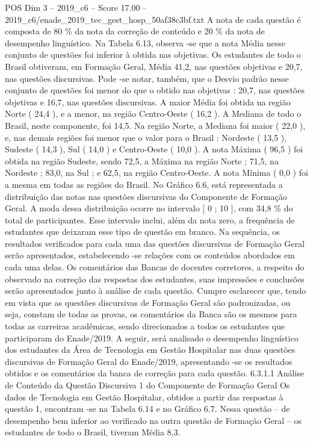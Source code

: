 \begin{textsample}{POS Dim 3 – 2019\_c6 – Score 17.00 – 2019\_c6/enade\_2019\_tec\_gest\_hosp\_50af38c3bf.txt}
A nota de cada questão é composta de 80 \% da nota da correção de conteúdo e 20 \% da nota de desempenho linguístico.
Na Tabela 6.13, observa -se que a nota Média nesse conjunto de questões foi inferior à obtida nas objetivas.
Os estudantes de todo o Brasil obtiveram, em Formação Geral, Média 41,2, nas questões objetivas e 20,7, nas questões discursivas.
Pode -se notar, também, que o Desvio padrão nesse conjunto de questões foi menor do que o obtido nas objetivas : 20,7, nas questões objetivas e 16,7, nas questões discursivas.
A maior Média foi obtida na região Norte ( 24,4 ), e a menor, na região Centro-Oeste ( 16,2 ).
A Mediana de todo o Brasil, neste componente, foi 14,5.
Na região Norte, a Mediana foi maior ( 22,0 ), e, nas demais regiões foi menor que o valor para o Brasil : Nordeste ( 13,5 ), Sudeste ( 14,3 ), Sul ( 14,0 ) e Centro-Oeste ( 10,0 ).
A nota Máxima ( 96,5 ) foi obtida na região Sudeste, sendo 72,5, a Máxima na região Norte ; 71,5, na Nordeste ; 83,0, na Sul ; e 62,5, na região Centro-Oeste.
A nota Mínima ( 0,0 ) foi a mesma em todas as regiões do Brasil.
No Gráfico 6.6, está representada a distribuição das notas nas questões discursivas do Componente de Formação Geral.
A moda dessa distribuição ocorre no intervalo [ 0 ; 10 ], com 34,8 \% do total de participantes.
Esse intervalo inclui, além da nota zero, a frequência de estudantes que deixaram esse tipo de questão em branco.
Na sequência, os resultados verificados para cada uma das questões discursivas de Formação Geral serão apresentados, estabelecendo -se relações com os conteúdos abordados em cada uma delas.
Os comentários das Bancas de docentes corretores, a respeito do observado na correção das respostas dos estudantes, suas impressões e conclusões serão apresentados junto à análise de cada questão.
Cumpre esclarecer que, tendo em vista que as questões discursivas de Formação Geral são padronizadas, ou seja, constam de todas as provas, os comentários da Banca são os mesmos para todas as carreiras acadêmicas, sendo direcionados a todos os estudantes que participaram do Enade/2019.
A seguir, será analisado o desempenho linguístico dos estudantes da Área de Tecnologia em Gestão Hospitalar nas duas questões discursivas de Formação Geral do Enade/2019, apresentando -se os resultados obtidos e os comentários da banca de correção para cada questão. 6.3.1.1 Análise de Conteúdo da Questão Discursiva 1 do Componente de Formação Geral Os dados de Tecnologia em Gestão Hospitalar, obtidos a partir das respostas à questão 1, encontram -se na Tabela 6.14 e no Gráfico 6.7.
Nessa questão – de desempenho bem inferior ao verificado na outra questão de Formação Geral – os estudantes de todo o Brasil, tiveram Média 8,3.

\end{textsample}
